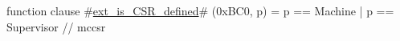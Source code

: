 function clause #\hyperref[sailRISCVzextzyiszyCSRzydefined]{ext\_is\_CSR\_defined}# (0xBC0, p) = p == Machine | p == Supervisor // mccsr
